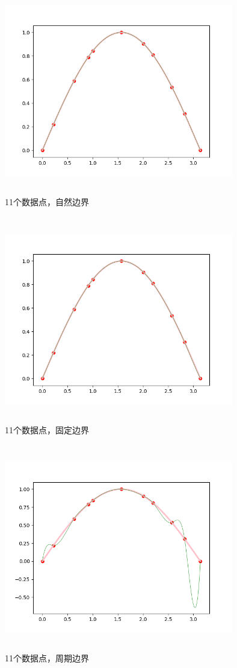 \documentclass[UTF8]{ctexart}
\begin{document}
\begin{figure}[H]
 \centering
  \includegraphics[width=10cm,height=9cm]{4-0_11.png}
  \caption{11个数据点，自然边界}
\end{figure}
\begin{figure}[H]
 \centering
  \includegraphics[width=10cm,height=9cm]{4-1_11.png}
  \caption{11个数据点，固定边界}
\end{figure}
\begin{figure}[H]
 \centering
  \includegraphics[width=10cm,height=9cm]{4-2_11.png}
  \caption{11个数据点，周期边界}
\end{figure}
\end{document}
